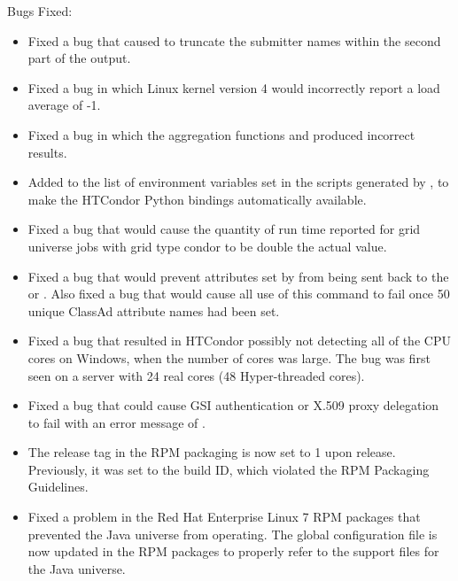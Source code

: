\noindent Bugs Fixed:

\begin{itemize}

\item Fixed a bug that caused  
 to truncate the submitter names within the second part of
the output.

\item Fixed a bug in which Linux kernel version 4 would incorrectly report
a load average of -1.

\item Fixed a bug in which the  aggregation functions 
 and  produced incorrect results.

\item Added  to the list of environment variables set in the
scripts generated by , to make the HTCondor Python
bindings automatically available.

\item Fixed a bug that would cause the quantity of run time reported for 
grid universe jobs with grid type condor to be double the actual value.

\item Fixed a bug that would prevent attributes set by  
from being sent back to the  or . Also fixed a bug that would
cause all use of this  command to fail once 50 unique ClassAd attribute names had been set.

\item Fixed a bug that resulted in HTCondor possibly not detecting all of 
the CPU cores on Windows, when the number of cores was large. 
The bug was first seen on a server with 24 real cores (48 Hyper-threaded cores).

\item Fixed a bug that could cause GSI authentication or X.509 proxy
delegation to fail with an error message of
.

\item 
The release tag in the RPM packaging is now set to 1 upon release.
Previously, it was set to the build ID, which violated the RPM Packaging
Guidelines.

\item Fixed a problem in the Red Hat Enterprise Linux 7 RPM packages
that prevented the Java universe from operating.
The global configuration file is now updated in the RPM packages
to properly refer to the support files for the Java universe.


\end{itemize}
